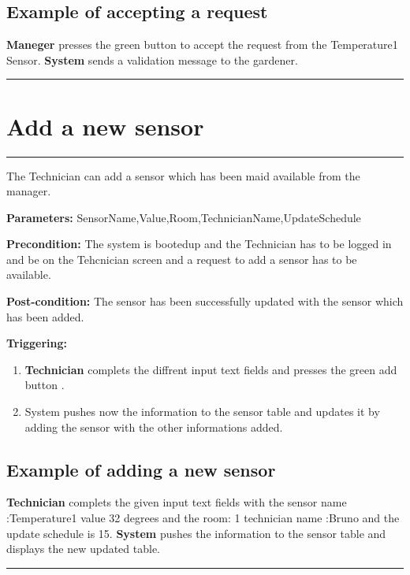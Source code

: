 \subsection{Example of accepting a request}
\textbf{Maneger} presses the green button to accept the request from the
Temperature1 Sensor. \textbf{System} sends a validation message to the gardener.
\hfill
\vspace{0.5cm}
\hrule

\break

\section{Add a new sensor}

\hrule
\hfill
\vspace{0.5cm}

\label{operation:Add a new sensor}
The Technician can add a sensor which has been maid available from the manager.
\begin{description}
\item \textbf{Parameters:} SensorName,Value,Room,TechnicianName,UpdateSchedule
\item \textbf{Precondition:} The system is bootedup and the Technician has to be
logged in and be on the Tehcnician screen and a request to add a sensor has to
be available.
\item \textbf{Post-condition:} The sensor has been successfully updated with the
sensor which has been added.
\item \textbf{Triggering:}
\begin{enumerate}
\item \textbf{Technician} complets the diffrent input text fields and presses
the green add button .
\item System pushes now the information to the sensor table and updates it by
adding the sensor with the other informations added.
\end{enumerate}
\end{description}

\subsection{Example of adding a new sensor}
\textbf{Technician} complets the given input text fields with the sensor name
:Temperature1 value 32 degrees and the room: 1 technician name :Bruno and the
update schedule is 15. \textbf{System} pushes the information to the sensor
table and displays the new updated table.
\hfill
\vspace{0.5cm}
\hrule



